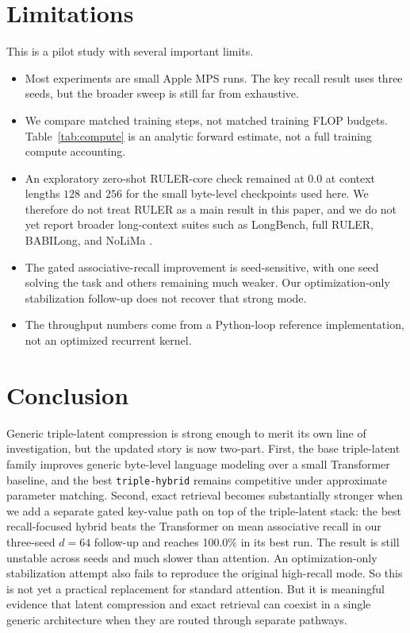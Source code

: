 \documentclass[11pt]{article}
\begin{document}
\section{Limitations}
This is a pilot study with several important limits.
\begin{itemize}[leftmargin=1.25em]
  \item Most experiments are small Apple MPS runs. The key recall result uses
  three seeds, but the broader sweep is still far from exhaustive.
  \item We compare matched training steps, not matched training FLOP budgets.
  Table~\ref{tab:compute} is an analytic forward estimate, not a full training
  compute accounting.
  \item An exploratory zero-shot RULER-core check remained at 0.0 at context
  lengths $128$ and $256$ for the small byte-level checkpoints used here. We
  therefore do not treat RULER as a main result in this paper, and we do not
  yet report broader long-context suites such as LongBench, full RULER,
  BABILong, and NoLiMa
  \citep{longbench2023, hsieh2024ruler, babilong2024, nolima2025}.
  \item The gated associative-recall improvement is seed-sensitive, with one
  seed solving the task and others remaining much weaker. Our optimization-only
  stabilization follow-up does not recover that strong mode.
  \item The throughput numbers come from a Python-loop reference
  implementation, not an optimized recurrent kernel.
\end{itemize}

\section{Conclusion}
Generic triple-latent compression is strong enough to merit its own line of
investigation, but the updated story is now two-part. First, the base
triple-latent family improves generic byte-level language modeling over a small
Transformer baseline, and the best \texttt{triple-hybrid} remains competitive
under approximate parameter matching. Second, exact retrieval becomes
substantially stronger when we add a separate gated key-value path on top of
the triple-latent stack: the best recall-focused hybrid beats the Transformer
on mean associative recall in our three-seed $d=64$ follow-up and reaches
100.0\% in its best run. The result is still unstable across seeds and much
slower than attention. An optimization-only stabilization attempt also fails to
reproduce the original high-recall mode. So this is not yet a practical
replacement for standard attention. But it is meaningful evidence that latent
compression and exact retrieval can coexist in a single generic architecture
when they are routed through separate pathways.
\end{document}
